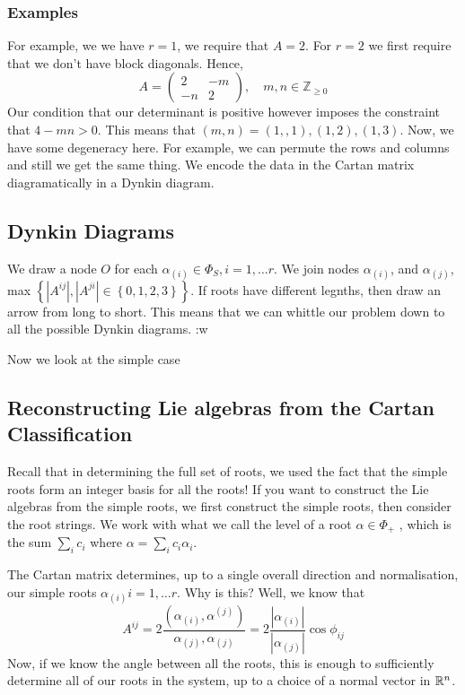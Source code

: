 \subsubsection{Examples} 
For example, we we have $ r  = 1 $, we require that 
$ A = 2 $.  
For $ r = 2 $ we first require that we don't have block diagonals. 
Hence, 
\[
 A  = \begin{pmatrix}  2 & -m \\ -n & 2  \end{pmatrix}  , \quad m , n \in \mathbb{ Z} _{ \geq 0 } 
\] Our condition that our determinant 
is positive however imposes the constraint that $ 4  - m n > 0 $. 
This means that $ (m , n ) = \left(  1, ,1  \right), \left( 1, 2  \right) , \left( 1, 3  \right) $. 
Now, we have some degeneracy here. For 
example, we can permute the rows and columns and still 
we get the same thing. 
We encode the data in the Cartan matrix diagramatically
in a Dynkin diagram. 

\subsection{Dynkin Diagrams} 
We draw a node $ O $ for each $ \alpha _{ \left( i  \right)  } \in \Phi  _ S , i = 1, \dots r $. 
We join nodes $ \alpha _{ \left( i  \right)  } $, and $ \alpha _{ \left( j  \right)  }$, 
max $ \left\{  | A ^{ ij } | , | A ^{ ji } | \in \left\{  0 , 1, 2, 3  \right\}  \right\} $. 
If roots have different legnths, then draw an arrow from 
long to short. 
This means that we can 
whittle our problem down to all the possible Dynkin diagrams. :w

Now we look at the simple case

\subsection{Reconstructing Lie algebras from the Cartan Classification } 
Recall that in determining the full set of roots, 
we used the fact that the simple roots 
form an integer basis for all the roots! 
If you want to construct the Lie algebras from the simple roots, 
we first construct the simple roots, then consider the root strings. 
We work with what we call the level of a root $ \alpha \in \Phi_ + $ , 
which is the sum $ \sum _ i c _ i $ where $ \alpha  = \sum _ i c _  i \alpha _ i $. 

The Cartan matrix determines, up to a single 
overall direction and normalisation, our simple roots 
$ \alpha _{ \left( i  \right)  } i = 1, \dots r$. 
Why is this? Well, we know that 
\[
A ^{ ij }  = 2 \frac{\left( \alpha _{ \left( i  \right)  } , \alpha ^{ \left( j  \right)  }  \right)  }{ 
\alpha _{\left( j  \right)  }  , \alpha _{\left( j  \right)  } }  = 
2 \frac{ | \alpha _{ \left( i  \right)  } | }{ | \alpha _{ \left( j  \right)  }| }
\cos \phi _{ ij } 
\] Now, if we know the angle between all the roots, 
this is enough to sufficiently determine all of our roots in the system, 
up to a choice of a normal vector in $ \mathbb{R} ^ n $. 

